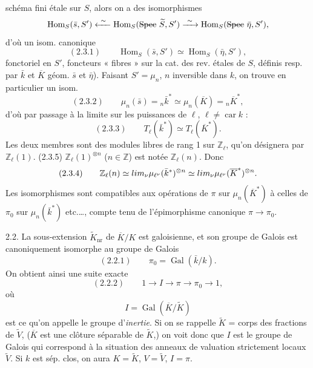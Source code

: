 \documentclass[11pt,a4paper]{article}
\begin{document}
schéma fini étale sur $S$, alors on a des isomorphismes
\[
  \operatorname{Hom}_S(\bar{s}, S') \xleftarrow{\ \sim\ } \operatorname{Hom}_S(\text{\struck{Spec}}\ \widetilde{S}, S') \xrightarrow{\ \sim\ } \operatorname{Hom}_S(\text{\struck{Spec}}\ \bar\eta, S') ,
\]
d'où un isom. canonique
\[
  (2.3.1) \qquad \operatorname{Hom}_S(\bar{s}, S') \simeq \operatorname{Hom}_S(\bar\eta, S') ,
\]
fonctoriel en $S'$,   foncteurs « fibres » sur la cat. des rev. étales de $S$, définis resp. par \struck{\ill{}} $\bar k$ et $\overline{K}$  géom. $\bar s$ et $\bar\eta$). Faisant $S' = \mu_n$, $n$  inversible dans $k$, on trouve en particulier un isom.
\[
  (2.3.2) \qquad \mu_n(\bar{s}) = {}_n\bar{k}^{*} \simeq \mu_n(\overline{K}) = {}_n\overline{K}^{*} ,
\]
d'où par passage à la limite sur les puissances de $\ell$, $\ell \neq \operatorname{car} k$ :
\[
  (2.3.3) \qquad T_\ell(\bar{k}^{*}) \simeq T_\ell(\overline{K}^{*}) .
\]
 Les deux membres sont des modules libres de rang 1 sur $\mathbb{Z}_\ell$,   qu'on désignera  par $\mathbb{Z}_\ell(1)$. \struck{\ill{}}
(2.3.5)  $\mathbb{Z}_\ell(1)^{\otimes n}$ ($n \in \mathbb{Z}$) est notée $\mathbb{Z}_\ell(n)$. Donc
\[
  (2.3.4) \qquad \mathbb{Z}_\ell(n) \simeq \varprojlim_\nu \mu_{\ell^\nu}(\bar{k}^{*})^{\otimes n} \simeq \varprojlim_\nu \mu_{\ell^\nu}(\overline{K}^{*})^{\otimes n} .
\]
Les isomorphismes \struck{\ill{}}  sont compatibles aux opérations de $\pi$ sur $\mu_n(\overline{K}^{*})$  à celles de $\pi_0$ sur $\mu_n(\bar{k}^{*})$ etc.\ldots, compte tenu de l'épimorphisme canonique $\pi \to \pi_0$.

2.2. La sous-extension $\widetilde{K}_{\mathrm{nr}}$ de $\overline{K}/K$ est galoisienne, et son groupe de Galois est canoniquement isomorphe au groupe de Galois
\[
  (2.2.1) \qquad \pi_0 = \operatorname{Gal}(\bar{k}/k) .
\]
On obtient ainsi une suite exacte
\[
  (2.2.2) \qquad 1 \longrightarrow I \longrightarrow \pi \longrightarrow \pi_0 \longrightarrow 1 ,
\]
où
\[
  I = \operatorname{Gal}(\overline{K}/\widetilde{K})
\]
est ce qu'on appelle le groupe d'\emph{inertie}. \struck{\ill{}}  Si on se rappelle  $\widetilde{K}$ = corps des fractions de $\widetilde{V}$, ($\overline{K}$ est une clôture séparable de $\widetilde{K}$,) on voit donc que $I$ est le groupe de Galois qui correspond à la situation \struck{\ill{}} des anneaux de valuation strictement locaux $\widetilde{V}$. Si $k$ est sép. clos, on aura $K = \widetilde{K}$, $V = \widetilde{V}$, $I = \pi$.
\end{document}
